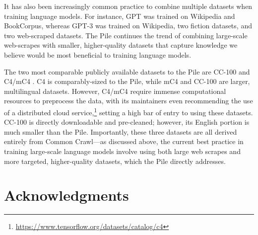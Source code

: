 \documentclass[11pt,a4paper]{article}
\begin{document}
It has also been increasingly common practice to combine multiple datasets when training language models. For instance, GPT \citep{GPT} was trained on Wikipedia and BookCorpus, whereas GPT-3 \citep{GPT3} was trained on Wikipedia, two fiction datasets, and two web-scraped datasets. The Pile continues the trend of combining large-scale web-scrapes with smaller, higher-quality datasets that capture knowledge we believe would be most beneficial to training language models.

The two most comparable publicly available datasets to the Pile are CC-100 \citep{wenzek2019ccnet} and C4/mC4 \citep{T5}. C4 is comparably-sized to the Pile, while mC4 and CC-100 are larger, multilingual datasets.
However, C4/mC4 require immense computational resources to preprocess the data, with its maintainers even recommending the use of a distributed cloud service,\footnote{\url{https://www.tensorflow.org/datasets/catalog/c4}} setting a high bar of entry to using these datasets. 
CC-100 is directly downloadable and pre-cleaned; however, its English portion is much smaller than the Pile.
Importantly, these three datasets are all derived entirely from Common Crawl---as discussed above, the current best practice in training large-scale language models involve using both large web scrapes and more targeted, higher-quality datasets, which the Pile directly addresses.

\begin{comment}

\section{Future Work}
There is ample opportunity for future work with the Pile. Although we have aimed here at detailing the purposes, collection processes, and attributes behind the Pile, there remains a great deal that may still be learned about the subject matter and voices represented in such a vast corpus. There is also the opportunity to conduct more thorough evaluations of the Pile using GPT-3 sized models, examining the effects on a wider array of downstream tasks. Additionally, the Pile is currently predominantly English; we leave for future work the creation of a larger, fully multilingual diverse text dataset by adding more non-English datasets and by implementing fully multilingual extraction of Common Crawl.

\end{comment}

\section{Acknowledgments}
\end{document}
